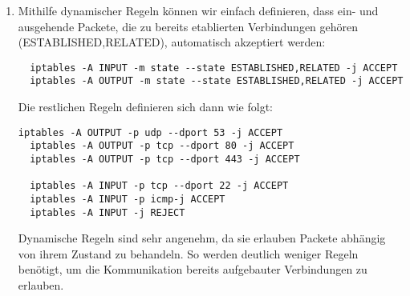 \documentclass{scrartcl}
\begin{document}
\begin{enumerate}[\bfseries 1.]
	\item Mithilfe dynamischer Regeln können wir einfach definieren, dass ein- und
	      ausgehende Packete, die zu bereits etablierten Verbindungen gehören
	      (ESTABLISHED,RELATED), automatisch akzeptiert werden:
	      \begin{lstlisting}
  iptables -A INPUT -m state --state ESTABLISHED,RELATED -j ACCEPT
  iptables -A OUTPUT -m state --state ESTABLISHED,RELATED -j ACCEPT
	\end{lstlisting}
	Die restlichen Regeln definieren sich dann wie folgt:
	\begin{lstlisting}[]
  iptables -A OUTPUT -p udp --dport 53 -j ACCEPT
  iptables -A OUTPUT -p tcp --dport 80 -j ACCEPT
  iptables -A OUTPUT -p tcp --dport 443 -j ACCEPT

  iptables -A INPUT -p tcp --dport 22 -j ACCEPT
  iptables -A INPUT -p icmp-j ACCEPT
  iptables -A INPUT -j REJECT
	\end{lstlisting}
	Dynamische Regeln sind sehr angenehm, da sie erlauben Packete abhängig
	von ihrem Zustand zu behandeln. So werden deutlich weniger Regeln benötigt,
	um die Kommunikation bereits aufgebauter Verbindungen zu erlauben.
\end{enumerate}
\end{document}
